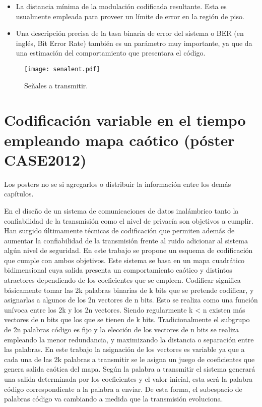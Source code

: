 \begin{itemize}
    \item
        La distancia mínima de la modulación codificada resultante. Esta  es
        usualmente empleada para proveer un límite de error en la región
        de piso.
    \item
        Una descripción precisa de la tasa binaria de error
        del sistema o BER (en inglés, Bit Error Rate) también es un
        parámetro muy importante, ya que da una estimación del
        comportamiento que presentara el código.
\end{itemize}


\begin{figure}
    \centering
    \texttt{[image: senalent.pdf]}\\
    \caption{Señales a transmitir.}\label{senal}
\end{figure}

%


\section{Codificación variable en el tiempo empleando mapa caótico (póster CASE2012)}

Los posters no se si agregarlos o distribuir la información entre los demás capítulos.

En el diseño de un sistema de comunicaciones de datos inalámbrico tanto la confiabilidad de la
transmisión como el nivel de privacía son objetivos a cumplir. Han surgido últimamente técnicas de
codificación que permiten además de aumentar la confiabilidad de la transmisión frente al ruido adicionar
al sistema algún nivel de seguridad. En este trabajo se propone un esquema de codificación que cumple
con ambos objetivos. Este sistema se basa en un mapa cuadrático bidimensional cuya salida presenta un
comportamiento caótico y distintos atractores dependiendo de los coeficientes que se empleen.
Codificar significa básicamente tomar las 2k palabras binarias de k bits que se pretende codificar, y
asignarlas a algunos de los 2n vectores de n bits. Esto se realiza como una función unívoca entre los 2k y
los 2n vectores. Siendo regularmente k < n existen más vectores de n bits que los que se tienen de k bits.
Tradicionalmente el subgrupo de 2n palabras código es fijo y la elección de los vectores de n bits se realiza
empleando la menor redundancia, y maximizando la distancia o separación entre las palabras. En este
trabajo la asignación de los vectores es variable ya que a cada una de las 2k palabras a transmitir se le
asigna un juego de coeficientes que genera salida caótica del mapa. Según la palabra a transmitir el
sistema generará una salida determinada por los coeficientes y el valor inicial, esta será la palabra código
correspondiente a la palabra a enviar. De esta forma, el subespacio de palabras código va cambiando a
medida que la transmisión evoluciona.


